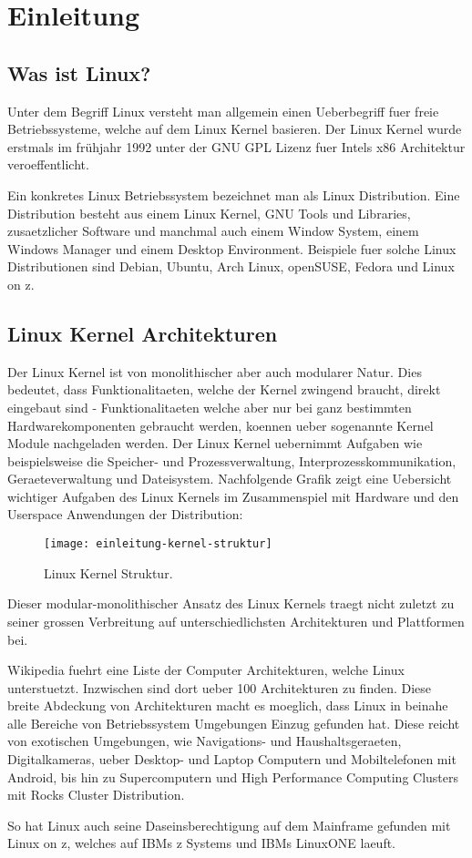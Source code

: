 \chapter{Einleitung}
\label{cha:Einleitung}

\section{Was ist Linux?}

Unter dem Begriff Linux versteht man allgemein einen Ueberbegriff fuer freie Betriebssysteme, welche auf dem Linux Kernel basieren. Der Linux Kernel wurde erstmals im frühjahr 1992 unter der GNU GPL Lizenz fuer Intels x86 Architektur veroeffentlicht.

Ein konkretes Linux Betriebssystem bezeichnet man als Linux Distribution. Eine Distribution besteht aus einem Linux Kernel, GNU Tools und Libraries, zusaetzlicher Software und manchmal auch einem Window System, einem Windows Manager und einem Desktop Environment. Beispiele fuer solche Linux Distributionen sind Debian, Ubuntu, Arch Linux, openSUSE, Fedora und Linux on z.

\section{Linux Kernel Architekturen}

Der Linux Kernel ist von monolithischer aber auch modularer Natur. Dies bedeutet, dass Funktionalitaeten, welche der Kernel zwingend braucht, direkt eingebaut sind - Funktionalitaeten welche aber nur bei ganz bestimmten Hardwarekomponenten gebraucht werden, koennen ueber sogenannte Kernel Module nachgeladen werden.
Der Linux Kernel uebernimmt Aufgaben wie beispielsweise die Speicher- und Prozessverwaltung, Interprozesskommunikation, Geraeteverwaltung und Dateisystem.
Nachfolgende Grafik zeigt eine Uebersicht wichtiger Aufgaben des Linux Kernels im Zusammenspiel mit Hardware und den Userspace Anwendungen der Distribution:

\begin{figure}[h!]
\centering
\texttt{[image: einleitung-kernel-struktur]}
\caption{Linux Kernel Struktur\cite{KernelStruktur}.}
\label{fig:KernelStruktur}
\end{figure}

\newpage

Dieser modular-monolithischer Ansatz des Linux Kernels traegt nicht zuletzt zu seiner grossen Verbreitung auf unterschiedlichsten Architekturen und Plattformen bei.

Wikipedia fuehrt eine Liste der Computer Architekturen, welche Linux unterstuetzt.
Inzwischen sind dort ueber 100 Architekturen zu finden. Diese breite Abdeckung von Architekturen macht es moeglich, dass Linux in beinahe alle Bereiche von Betriebssystem Umgebungen Einzug gefunden hat. Diese reicht von exotischen Umgebungen, wie Navigations- und Haushaltsgeraeten, Digitalkameras, ueber Desktop- und Laptop Computern und Mobiltelefonen mit Android, bis hin zu Supercomputern und High Performance Computing Clusters mit Rocks Cluster Distribution.

So hat Linux auch seine Daseinsberechtigung auf dem Mainframe gefunden mit Linux on z, welches auf IBMs z Systems und IBMs LinuxONE laeuft.
